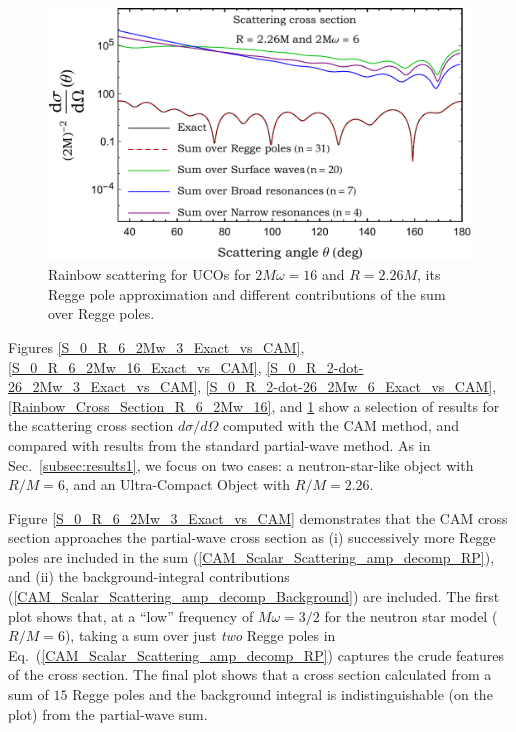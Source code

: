 \documentclass[aps,prd,longbibliography,reprint,twocolumn,amsmath,amssymb,amsfonts,showpacs,footnote,superscriptaddress]{revtex4-1}%
\begin{document}
\begin{figure}[htp!]
\centering
 \includegraphics[scale=0.50]{Diff_Contribution_Cross_Section_R_2-dot-26_2Mw_6}
  \vspace*{-0.45cm}
\caption{\label{Diff_Contribution_Cross_Section_R_2-dot-26_2Mw_6} Rainbow scattering for UCOs for $2M\omega=16$ and $R=2.26M$, its Regge pole approximation and different contributions of the sum over Regge poles.}
\end{figure}

Figures \ref{S_0_R_6_2Mw_3_Exact_vs_CAM}, \ref{S_0_R_6_2Mw_16_Exact_vs_CAM}, \ref{S_0_R_2-dot-26_2Mw_3_Exact_vs_CAM}, \ref{S_0_R_2-dot-26_2Mw_6_Exact_vs_CAM}, \ref{Rainbow_Cross_Section_R_6_2Mw_16}, and \ref{Diff_Contribution_Cross_Section_R_2-dot-26_2Mw_6} show a selection of results for the scattering cross section $d\sigma / d\Omega$ computed with the CAM method, and compared with results from the standard partial-wave method. As in Sec.~\ref{subsec:results1}, we focus on two cases: a neutron-star-like object with $R/M = 6$, and an Ultra-Compact Object with $R/M = 2.26$.

Figure \ref{S_0_R_6_2Mw_3_Exact_vs_CAM} demonstrates that the CAM cross section approaches the partial-wave cross section as (i) successively more Regge poles are included in the sum (\ref{CAM_Scalar_Scattering_amp_decomp_RP}), and (ii) the background-integral contributions (\ref{CAM_Scalar_Scattering_amp_decomp_Background}) are included. The first plot shows that, at a ``low'' frequency of $M \omega = 3/2$ for the neutron star model ($R/M = 6$), taking a sum over just \emph{two} Regge poles in Eq.~(\ref{CAM_Scalar_Scattering_amp_decomp_RP}) captures the crude features of the cross section. The final plot shows that a cross section calculated from a sum of $15$ Regge poles and the background integral is indistinguishable (on the plot) from the partial-wave sum.
\end{document}
